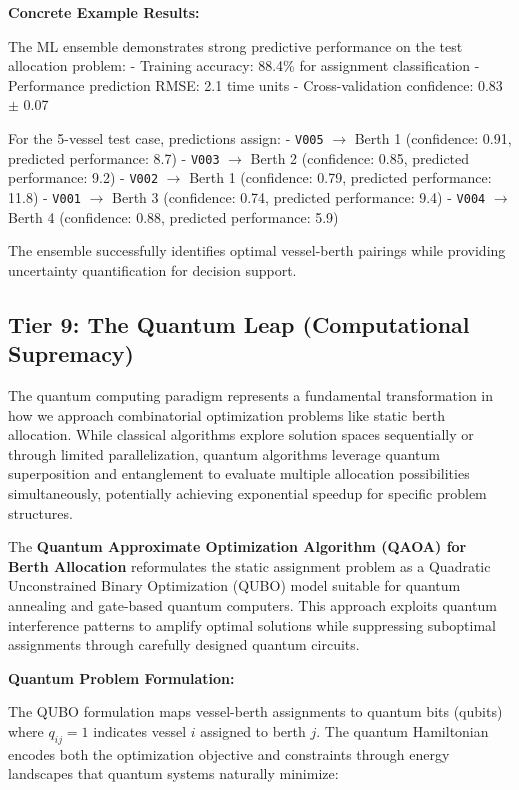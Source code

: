 \documentclass{article}
\begin{document}
\textbf{Concrete Example Results:}

The ML ensemble demonstrates strong predictive performance on the test allocation problem:
- Training accuracy: 88.4\% for assignment classification
- Performance prediction RMSE: 2.1 time units  
- Cross-validation confidence: 0.83 $\pm$ 0.07

For the 5-vessel test case, predictions assign:
- \texttt{V005} $\to$ Berth 1 (confidence: 0.91, predicted performance: 8.7)
- \texttt{V003} $\to$ Berth 2 (confidence: 0.85, predicted performance: 9.2)
- \texttt{V002} $\to$ Berth 1 (confidence: 0.79, predicted performance: 11.8)
- \texttt{V001} $\to$ Berth 3 (confidence: 0.74, predicted performance: 9.4)
- \texttt{V004} $\to$ Berth 4 (confidence: 0.88, predicted performance: 5.9)

The ensemble successfully identifies optimal vessel-berth pairings while providing uncertainty quantification for decision support.

\subsection{Tier 9: The Quantum Leap (Computational Supremacy)}

The quantum computing paradigm represents a fundamental transformation in how we approach combinatorial optimization problems like static berth allocation. While classical algorithms explore solution spaces sequentially or through limited parallelization, quantum algorithms leverage quantum superposition and entanglement to evaluate multiple allocation possibilities simultaneously, potentially achieving exponential speedup for specific problem structures.

The \textbf{Quantum Approximate Optimization Algorithm (QAOA) for Berth Allocation} reformulates the static assignment problem as a Quadratic Unconstrained Binary Optimization (QUBO) model suitable for quantum annealing and gate-based quantum computers. This approach exploits quantum interference patterns to amplify optimal solutions while suppressing suboptimal assignments through carefully designed quantum circuits.

\textbf{Quantum Problem Formulation:}

The QUBO formulation maps vessel-berth assignments to quantum bits (qubits) where $q_{ij} = 1$ indicates vessel $i$ assigned to berth $j$. The quantum Hamiltonian encodes both the optimization objective and constraints through energy landscapes that quantum systems naturally minimize:
\end{document}

